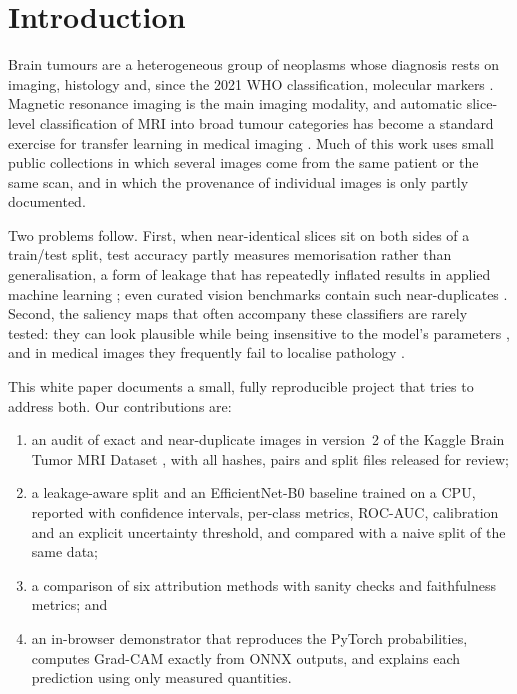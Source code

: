 \documentclass[11pt,a4paper]{article}
\begin{document}
\section{Introduction}
Brain tumours are a heterogeneous group of neoplasms whose diagnosis rests on imaging, histology and, since the 2021 WHO classification, molecular markers \citep{louis2021}. Magnetic resonance imaging is the main imaging modality, and automatic slice-level classification of MRI into broad tumour categories has become a standard exercise for transfer learning in medical imaging \citep{deepak2019,swati2019,badza2020}. Much of this work uses small public collections in which several images come from the same patient or the same scan, and in which the provenance of individual images is only partly documented.

Two problems follow. First, when near-identical slices sit on both sides of a train/test split, test accuracy partly measures memorisation rather than generalisation, a form of leakage that has repeatedly inflated results in applied machine learning \citep{kapoor2023,roberts2021}; even curated vision benchmarks contain such near-duplicates \citep{barz2020}. Second, the saliency maps that often accompany these classifiers are rarely tested: they can look plausible while being insensitive to the model's parameters \citep{adebayo2018}, and in medical images they frequently fail to localise pathology \citep{arun2021,saporta2022}.

This white paper documents a small, fully reproducible project that tries to address both. Our contributions are:
\begin{enumerate}
\item an audit of exact and near-duplicate images in version~2 of the Kaggle Brain Tumor MRI Dataset \citep{nickparvar2021}, with all hashes, pairs and split files released for review;
\item a leakage-aware split and an EfficientNet-B0 \citep{tan2019} baseline trained on a CPU, reported with confidence intervals, per-class metrics, ROC-AUC, calibration and an explicit uncertainty threshold, and compared with a naive split of the same data;
\item a comparison of six attribution methods with sanity checks and faithfulness metrics; and
\item an in-browser demonstrator that reproduces the PyTorch probabilities, computes Grad-CAM exactly from ONNX outputs, and explains each prediction using only measured quantities.
\end{enumerate}
\end{document}
